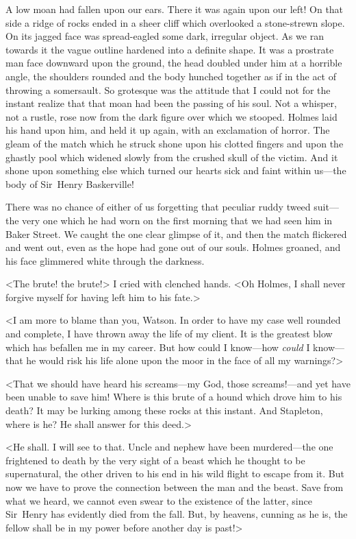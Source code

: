 A low moan had fallen upon our ears. There it was again upon our left! On that side a ridge of rocks ended in a sheer cliff which overlooked a stone-strewn slope. On its jagged face was spread-eagled some dark, irregular object. As we ran towards it the vague outline hardened into a definite shape. It was a prostrate man face downward upon the ground, the head doubled under him at a horrible angle, the shoulders rounded and the body hunched together as if in the act of throwing a somersault. So grotesque was the attitude that I could not for the instant realize that that moan had been the passing of his soul. Not a whisper, not a rustle, rose now from the dark figure over which we stooped. Holmes laid his hand upon him, and held it up again, with an exclamation of horror. The gleam of the match which he struck shone upon his clotted fingers and upon the ghastly pool which widened slowly from the crushed skull of the victim. And it shone upon something else which turned our hearts sick and faint within us—the body of Sir~Henry Baskerville!

There was no chance of either of us forgetting that peculiar ruddy tweed suit—the very one which he had worn on the first morning that we had seen him in Baker Street. We caught the one clear glimpse of it, and then the match flickered and went out, even as the hope had gone out of our souls. Holmes groaned, and his face glimmered white through the darkness.

<The brute! the brute!> I cried with clenched hands. <Oh Holmes, I shall never forgive myself for having left him to his fate.>

<I am more to blame than you, Watson. In order to have my case well rounded and complete, I have thrown away the life of my client. It is the greatest blow which has befallen me in my career. But how could I know—how \emph{could} I know—that he would risk his life alone upon the moor in the face of all my warnings?>

<That we should have heard his screams—my God, those screams!—and yet have been unable to save him! Where is this brute of a hound which drove him to his death? It may be lurking among these rocks at this instant. And Stapleton, where is he? He shall answer for this deed.>

<He shall. I will see to that. Uncle and nephew have been murdered—the one frightened to death by the very sight of a beast which he thought to be supernatural, the other driven to his end in his wild flight to escape from it. But now we have to prove the connection between the man and the beast. Save from what we heard, we cannot even swear to the existence of the latter, since Sir~Henry has evidently died from the fall. But, by heavens, cunning as he is, the fellow shall be in my power before another day is past!>

